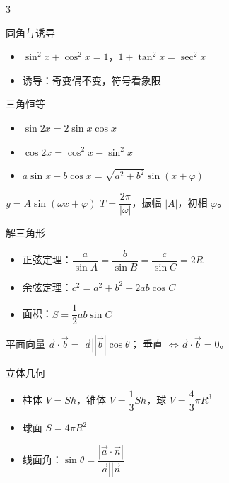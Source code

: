 \clearpage
\begin{multicols}{3}

\begin{fastcard}{同角与诱导}
\begin{itemize}[leftmargin=1.2em, topsep=0.2ex, itemsep=0.1ex, parsep=0pt]
\item $\sin^2x+\cos^2x=1$，$1+\tan^2x=\sec^2x$
\item 诱导：奇变偶不变，符号看象限
\end{itemize}
\end{fastcard}

\begin{fastcard}{三角恒等}
\begin{itemize}[leftmargin=1.2em, topsep=0.2ex, itemsep=0.1ex, parsep=0pt]
\item $\sin2x=2\sin x\cos x$
\item $\cos2x=\cos^2x-\sin^2x$
\item $a\sin x+b\cos x=\sqrt{a^2+b^2}\sin(x+\varphi)$
\end{itemize}
\end{fastcard}

\begin{fastcard}{$y=A\sin(\omega x+\varphi)$}
$T=\dfrac{2\pi}{|\omega|}$，振幅 $|A|$，初相 $\varphi$。
\end{fastcard}

\begin{fastcard}{解三角形}
\begin{itemize}[leftmargin=1.2em, topsep=0.2ex, itemsep=0.1ex, parsep=0pt]
\item 正弦定理：$\dfrac{a}{\sin A}=\dfrac{b}{\sin B}=\dfrac{c}{\sin C}=2R$
\item 余弦定理：$c^2=a^2+b^2-2ab\cos C$
\item 面积：$S=\dfrac12 ab\sin C$
\end{itemize}
\end{fastcard}

\begin{fastcard}{平面向量}
$\vec a\cdot\vec b=|\vec a||\vec b|\cos\theta$；
垂直 $\iff \vec a\cdot\vec b=0$。
\end{fastcard}

\begin{fastcard}{立体几何}
\begin{itemize}[leftmargin=1.2em, topsep=0.2ex, itemsep=0.1ex, parsep=0pt]
\item 柱体 $V=Sh$，锥体 $V=\dfrac13Sh$，球 $V=\dfrac43\pi R^3$
\item 球面 $S=4\pi R^2$
\item 线面角：$\sin\theta=\dfrac{|\vec a\cdot\vec n|}{|\vec a||\vec n|}$
\end{itemize}
\end{fastcard}


\end{multicols}
